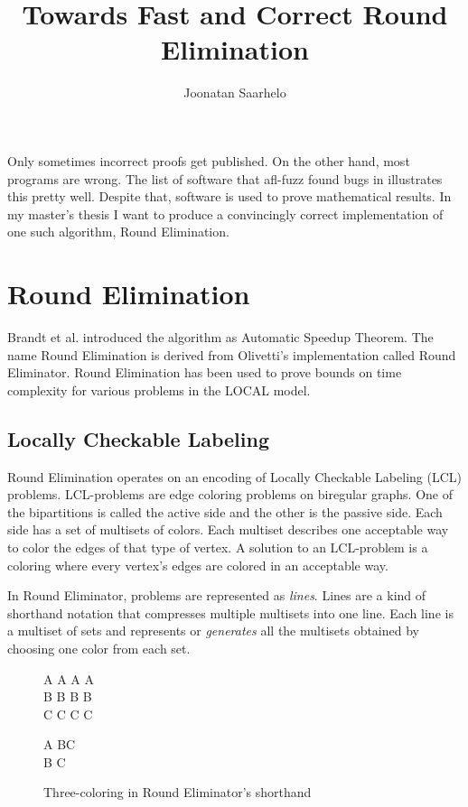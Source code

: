 \documentclass{article}
\title{Towards Fast and Correct Round Elimination}
\author{Joonatan Saarhelo}
\begin{document}
\maketitle

Only sometimes incorrect proofs get published. On the other hand, most programs are wrong. The list of software that afl-fuzz\cite{AFL} found bugs in illustrates this pretty well. Despite that, software is used to prove mathematical results. In my master's thesis I want to produce a convincingly correct implementation of one such algorithm, Round Elimination.

\section{Round Elimination}

Brandt et al. introduced the algorithm as Automatic Speedup Theorem\cite{speedup}. The name Round Elimination is derived from Olivetti's implementation called Round Eliminator\cite{RE}. Round Elimination has been used to prove bounds on time complexity for various problems in the LOCAL model.\cite{tc1, tc2, tc3}

\subsection{Locally Checkable Labeling}

Round Elimination operates on an encoding of Locally Checkable Labeling (LCL) problems. LCL-problems are edge coloring problems on biregular graphs. One of the bipartitions is called the active side and the other is the passive side. Each side has a set of multisets of colors. Each multiset describes one acceptable way to color the edges of that type of vertex. A solution to an LCL-problem is a coloring where every vertex's edges are colored in an acceptable way.

In Round Eliminator, problems are represented as \emph{lines}. Lines are a kind of shorthand notation that compresses multiple multisets into one line. Each line is a multiset of sets and represents or \emph{generates} all the multisets obtained by choosing one color from each set.\cite{RE}

\begin{figure}[h]
\centering
\begin{tcolorbox}[width=.2\textwidth, nobeforeafter, title=active side]
A A A A \\
B B B B \\
C C C C
\end{tcolorbox}
\begin{tcolorbox}[width=.2\textwidth, nobeforeafter, title=passive side]
A BC \\
B C
\end{tcolorbox}
\caption{Three-coloring in Round Eliminator's shorthand}
\end{figure}
\end{document}
